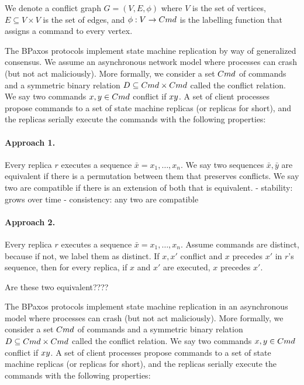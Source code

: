 We denote a conflict
graph $G = (V, E, \phi)$ where $V$ is the set of vertices, $E \subseteq V
\times V$ is the set of edges, and $\phi: V \to Cmd$ is the labelling function
that assigns a command to every vertex.


\vspace{1in}

The BPaxos protocols implement state machine replication by way of generalized consensus. We assume an asynchronous network model where processes can crash (but not act maliciously). More formally, we consider a set $Cmd$ of commands and a symmetric binary relation $D \subseteq Cmd \times Cmd$ called the conflict relation. We say two commands $x, y \in Cmd$ conflict if $x  y$. A set of client processes propose commands to a set of state machine replicas (or replicas for short), and the replicas serially execute the commands with the following properties:





\paragraph{Approach 1.}
Every replica $r$ executes a sequence $\bar{x} = x_1, \ldots, x_n$. We say two
sequences $\bar{x}, \bar{y}$ are equivalent if there is a permutation between
them that preserves conflicts. We say two are compatible if there is an
extension of both that is equivalent.
  - stability: grows over time
  - consistency: any two are compatible


\paragraph{Approach 2.}
Every replica $r$ executes a sequence $\bar{x} = x_1, \ldots, x_n$. Assume
commands are distinct, because if not, we label them as distinct. If $x, x'$ conflict and $x$ precedes $x'$ in $r$'s sequence, then for every replica, if $x$ and $x'$ are executed, $x$ precedes $x'$.

Are these two equivalent????

The BPaxos protocols implement state machine replication in an asynchronous model where processes can crash (but not act maliciously). More formally, we consider a set $Cmd$ of commands and a symmetric binary relation $D \subseteq Cmd \times Cmd$ called the conflict relation. We say two commands $x, y \in Cmd$ conflict if $x  y$. A set of client processes propose commands to a set of state machine replicas (or replicas for short), and the replicas serially execute the commands with the following properties:

